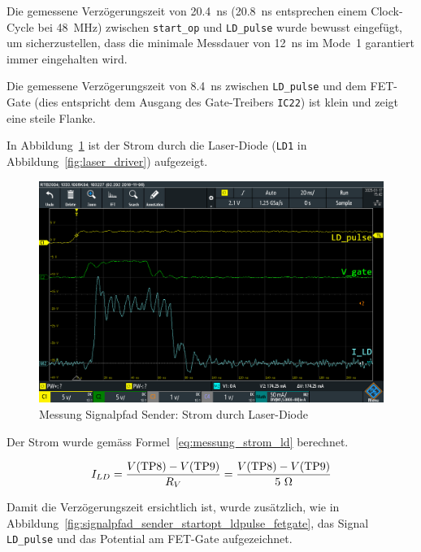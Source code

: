 Die gemessene Verzögerungszeit von 20.4~ns (20.8~ns entsprechen einem Clock-Cycle bei 48~MHz) zwischen
\lstinline|start_op| und \lstinline|LD_pulse| wurde bewusst eingefügt, um sicherzustellen, dass die minimale Messdauer
von 12~ns \cite{ti2016tdc7200_datasheet} im Mode~1 garantiert immer eingehalten wird.

Die gemessene Verzögerungszeit von 8.4~ns zwischen \lstinline|LD_pulse| und dem FET-Gate (dies entspricht dem Ausgang
des Gate-Treibers \lstinline|IC22|) ist klein und zeigt eine steile Flanke.

In Abbildung~\ref{fig:signalpfad_sender_ld_strom} ist der Strom durch die Laser-Diode (\lstinline|LD1| in
Abbildung~\ref{fig:laser_driver}) aufgezeigt.

\begin{figure}[H]
    \centering
    \includegraphics[width=\textwidth]{graphics/signalpfad_sender_ld_strom}
    \caption{Messung Signalpfad Sender: Strom durch Laser-Diode}\label{fig:signalpfad_sender_ld_strom}
\end{figure}

Der Strom wurde gemäss Formel~\ref{eq:messung_strom_ld} berechnet.

\begin{equation}\label{eq:messung_strom_ld}
    I_{LD} = \frac{V(\text{\lstinline|TP8|}) - V(\text{\lstinline|TP9|})}{R_V} = \frac{V(\text{\lstinline|TP8|}) - V(\text{\lstinline|TP9|})}{5~\Omega}
\end{equation}

Damit die Verzögerungszeit ersichtlich ist, wurde zusätzlich, wie in Abbildung~\ref{fig:signalpfad_sender_startopt_ldpulse_fetgate},
das Signal \lstinline|LD_pulse| und das Potential am FET-Gate aufgezeichnet.

